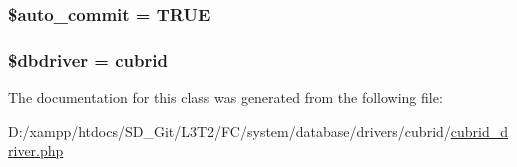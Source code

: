 \subsubsection[{\$auto\+\_\+commit}]{\setlength{\rightskip}{0pt plus 5cm}\$auto\+\_\+commit = T\+R\+U\+E}\label{class_c_i___d_b__cubrid__driver_a2620b91fdfd73aa770c443ad172f1914}
\hypertarget{class_c_i___d_b__cubrid__driver_a0cde2a16322a023d040aa7f725877597}{}
\subsubsection[{\$dbdriver}]{\setlength{\rightskip}{0pt plus 5cm}\$dbdriver = \textquotesingle{}cubrid\textquotesingle{}}\label{class_c_i___d_b__cubrid__driver_a0cde2a16322a023d040aa7f725877597}


The documentation for this class was generated from the following file\+:\begin{DoxyCompactItemize}
\item 
D\+:/xampp/htdocs/\+S\+D\+\_\+\+Git/\+L3\+T2/\+F\+C/system/database/drivers/cubrid/\hyperlink{cubrid__driver_8php}{cubrid\+\_\+driver.\+php}\end{DoxyCompactItemize}
